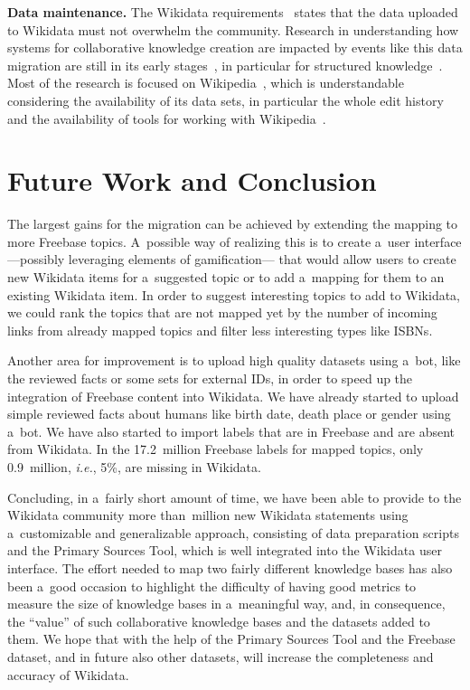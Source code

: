 \documentclass{sig-alternate-2013}
\begin{document}
\textbf{Data maintenance.}
The Wikidata requirements~\cite{wikidatareqs} states that the data uploaded to Wikidata
must not overwhelm the community.
Research in understanding how systems for collaborative knowledge creation are impacted
by events like this data migration are still in its early stages~\cite{moskaliuk2012collaborative},
in particular for structured knowledge~\cite{horridge2014webprotege}.
Most of the research is focused on Wikipedia~\cite{flock2015towards},
which is understandable considering the availability of its data sets,
in particular the whole edit history~\cite{schindler2011introducing}
and the availability of tools for working with Wikipedia~\cite{milne2013open}.


\section{Future Work and Conclusion}\label{sec:future-work-and-conclusion}

The largest gains for the migration can be achieved
by extending the mapping to more Freebase topics.
A~possible way of realizing this is to create a~user interface%
---possibly leveraging elements of gamification---%
that would allow users to create new Wikidata items for a~suggested topic
or to add a~mapping for them to an existing Wikidata item.
In order to suggest interesting topics to add to Wikidata,
we could rank the topics that are not mapped yet by the number of incoming links
from already mapped topics and filter less interesting types like ISBNs.

Another area for improvement is to upload high quality datasets using a~bot,
like the reviewed facts or some sets for external IDs,
in order to speed up the integration of Freebase content into Wikidata.
We have already started to upload simple reviewed facts about humans
like birth date, death place or gender using a~bot.
We have also started to import labels that are in Freebase and are absent from Wikidata.
In the 17.2~million Freebase labels for mapped topics,
only 0.9~million, \emph{i.e.}, 5\%, are missing in Wikidata.

Concluding, in a~fairly short amount of time, we have been able
to provide to the Wikidata community more than~million new Wikidata statements
using a~customizable and generalizable approach, consisting of data preparation scripts
and the Primary Sources Tool,
which is well integrated into the Wikidata user interface.
The effort needed to map two fairly different knowledge bases has also been a~good occasion
to highlight the difficulty of having good metrics to measure the size of knowledge bases
in a~meaningful way,
and, in consequence, the ``value'' of such collaborative knowledge bases and the datasets added to them.
We hope that with the help of the Primary Sources Tool and
the Freebase dataset, and in future also other datasets,
will increase the completeness and accuracy of Wikidata.




\balancecolumns
\end{document}
